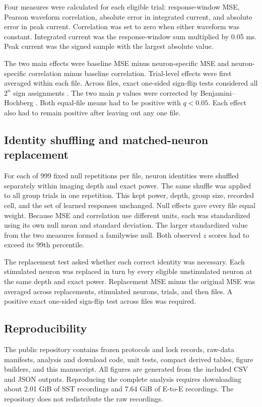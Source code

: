 \documentclass[10pt,twocolumn]{article}
\begin{document}
Four measures were calculated for each eligible trial: response-window MSE,
Pearson waveform correlation, absolute error in integrated current, and
absolute error in peak current. Correlation was set to zero when either
waveform was constant.
Integrated current was the response-window sum multiplied by 0.05 ms. Peak
current was the signed sample with the largest absolute value.

The two main effects were baseline MSE minus neuron-specific MSE and
neuron-specific correlation minus baseline correlation. Trial-level effects
were first averaged within each file. Across files, exact one-sided sign-flip
tests considered all $2^n$ sign assignments \citep{fisher1935design}. The two
main $p$ values were corrected by Benjamini--Hochberg
\citep{benjamini1995controlling}. Both equal-file means had to be positive
with $q<0.05$. Each effect also had to remain positive after leaving out any
one file.

\subsection{Identity shuffling and matched-neuron replacement}

For each of 999 fixed null repetitions per file, neuron identities were
shuffled separately within imaging depth and exact power. The same shuffle
was applied to all group trials in one repetition. This kept power, depth,
group size, recorded cell, and the set of learned responses unchanged. Null
effects gave every file equal weight. Because MSE and correlation use
different units, each was standardized using its own null mean and standard
deviation. The larger standardized value from the two measures formed a
familywise null. Both observed $z$ scores had to exceed its 99th percentile.

The replacement test asked whether each correct identity was necessary. Each
stimulated neuron was replaced in turn by every eligible unstimulated neuron
at the same depth and exact power. Replacement MSE minus the original MSE was
averaged across replacements, stimulated neurons, trials, and then files. A
positive exact one-sided sign-flip test across files was required.

\subsection{Reproducibility}

The public repository contains frozen protocols and lock records, raw-data
manifests, analysis and download code, unit tests, compact derived tables,
figure builders, and this manuscript. All figures are generated from the
included CSV and JSON outputs. Reproducing the complete analysis requires
downloading about 2.01 GiB of SST recordings and 7.64 GiB of E-to-E
recordings. The repository does not redistribute the raw recordings.
\end{document}
